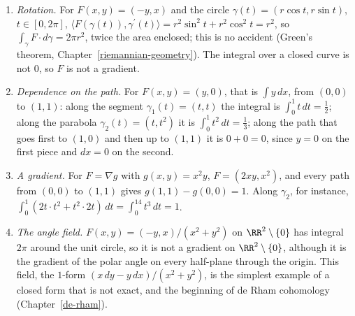 \begin{example}\label{real-analysis:example-second-kind}
\begin{enumerate}
\item \emph{Rotation.} For $F(x, y) = (-y, x)$ and the circle $\gamma(t) = (r\cos t, r\sin t)$, $t \in [0, 2\pi]$, $\langle F(\gamma(t)), \gamma^{\prime}(t)\rangle = r^2\sin^2t + r^2\cos^2t = r^2$, so
$\int_\gamma F \cdot d\gamma = 2\pi r^2$, twice the area enclosed; this is no accident (Green's theorem, Chapter~\ref{riemannian-geometry}). The integral over a closed curve is not $0$, so $F$ is not a gradient.
\item \emph{Dependence on the path.} For $F(x, y) = (y, 0)$, that is $\int y\,dx$, from $(0, 0)$ to $(1, 1)$: along the segment $\gamma_1(t) = (t, t)$ the integral is $\int_0^1t\,dt = \frac12$; along the
parabola $\gamma_2(t) = (t, t^2)$ it is $\int_0^1t^2\,dt = \frac13$; along the path that goes first to $(1, 0)$ and then up to $(1, 1)$ it is $0 + 0 = 0$, since $y = 0$ on the first piece and $dx = 0$ on
the second.
\item \emph{A gradient.} For $F = \nabla g$ with $g(x, y) = x^2y$, $F = (2xy, x^2)$, and every path from $(0, 0)$ to $(1, 1)$ gives $g(1, 1) - g(0, 0) = 1$. Along $\gamma_2$, for instance,
$\int_0^1(2t \cdot t^2 + t^2 \cdot 2t)\,dt = \int_0^14t^3\,dt = 1$.
\item \emph{The angle field.} $F(x, y) = (-y, x)/(x^2 + y^2)$ on $\RR^2 \setminus \{0\}$ has integral $2\pi$ around the unit circle, so it is not a gradient on $\RR^2 \setminus \{0\}$, although it is the gradient of
the polar angle on every half-plane through the origin. This field, the $1$-form $(x\,dy - y\,dx)/(x^2 + y^2)$, is the simplest example of a closed form that is not exact, and the beginning of de Rham cohomology
(Chapter~\ref{de-rham}).
\end{enumerate}
\end{example}

